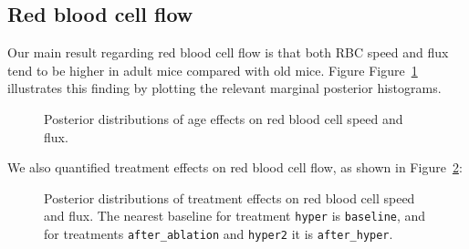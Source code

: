 \documentclass[
  letterpaper,
  DIV=11,
  numbers=noendperiod,
  oneside]{scrartcl}
\theoremstyle{plain}
\theoremstyle{remark}
\begin{document}
\subsection{Red blood cell flow}\label{red-blood-cell-flow}

Our main result regarding red blood cell flow is that both RBC speed and
flux tend to be higher in adult mice compared with old mice. Figure
Figure~\ref{fig-flow-age-effects} illustrates this finding by plotting
the relevant marginal posterior histograms.

\begin{figure}


\caption{\label{fig-flow-age-effects}Posterior distributions of age
effects on red blood cell speed and flux.}

\end{figure}%

We also quantified treatment effects on red blood cell flow, as shown in
Figure~\ref{fig-flow-treatment-effects}:

\begin{figure}


\caption{\label{fig-flow-treatment-effects}Posterior distributions of
treatment effects on red blood cell speed and flux. The nearest baseline
for treatment \texttt{hyper} is \texttt{baseline}, and for treatments
\texttt{after\_ablation} and \texttt{hyper2} it is
\texttt{after\_hyper}.}

\end{figure}%
\end{document}
